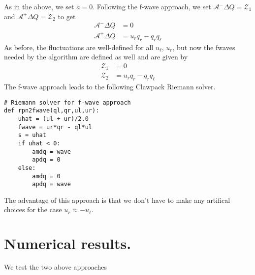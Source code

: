\documentclass{article}
\begin{document}
As in the above, we set $a = 0$.  Following the f-wave approach, we set $\mathcal A^- \Delta Q = \mathcal Z_1$ and $\mathcal A^+ \Delta Q = \mathcal Z_2$ to get
\begin{align}
\mathcal A^- \Delta Q & = 0 \\
\mathcal A^+ \Delta Q & = u_r q_r - q_r q_\ell
\end{align}
As before, the fluctuations are well-defined for all $u_\ell$, $u_r$, but now the fwaves needed by the algorithm are defined as well and are given by
\begin{align}
\mathcal Z_1 & = 0 \\
\mathcal Z_2 & = u_r q_r - q_r q_\ell
\end{align}
The f-wave approach leads to the following Clawpack Riemann solver. 

\vspace{0.25cm}

\begin{minipage}{\textwidth}
\begin{verbatim}
# Riemann solver for f-wave approach
def rpn2fwave(ql,qr,ul,ur):
    uhat = (ul + ur)/2.0
    fwave = ur*qr - ql*ul
    s = uhat
    if uhat < 0:
        amdq = wave
        apdq = 0
    else:
        amdq = 0
        apdq = wave
\end{verbatim}
\end{minipage}

\vspace{0.25cm}

\noindent
The advantage of this approach is that we don't have to make any artifical choices for the case $u_r \approx -u_\ell$.  

\section{Numerical results.}  We test the two above approaches





\end{document}
